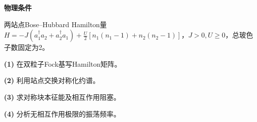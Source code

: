 \textbf{物理条件}\par 两站点Bose–Hubbard Hamilton量 \(H=-J(a_1^\dagger a_2+a_2^\dagger a_1)+\frac U2[n_1(n_1-1)+n_2(n_2-1)]\)，\(J>0,U\ge0\)，总玻色子数固定为2。
\par\noindent\textbf{(1)} 在双粒子Fock基写Hamilton矩阵。
\par\noindent\textbf{(2)} 利用站点交换对称化约谱。
\par\noindent\textbf{(3)} 求对称块本征能及相互作用阻塞。
\par\noindent\textbf{(4)} 分析无相互作用极限的振荡频率。
